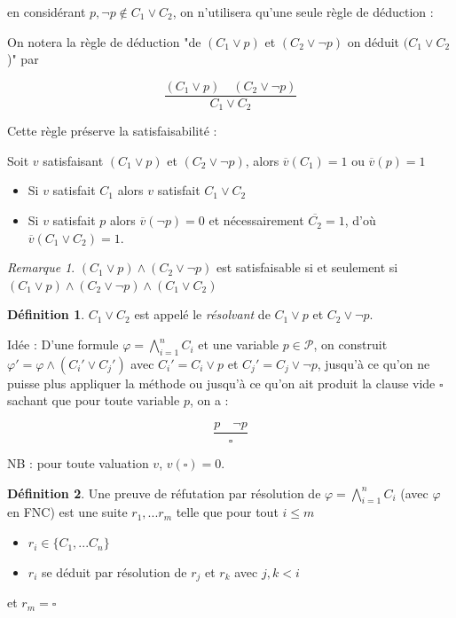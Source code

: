 \documentclass[]{article}
\theoremstyle{remark}
\newtheorem{myrem}{Remarque}
\theoremstyle{definition}
\newtheorem{mydef}{Définition}
\begin{document}
en considérant $p, \neg p \notin C_1 \lor C_2$, on n'utilisera qu'une seule règle de déduction :

On notera la règle de déduction "de $(C_1 \lor p)$ et $(C_2 \lor \neg p)$ on déduit $(C_1 \lor C_2$)" par

$$\frac{(C_1 \lor p) \quad (C_2 \lor \neg p)}{C_1 \lor C_2}$$

Cette règle préserve la satisfaisabilité :

Soit $v$ satisfaisant $(C_1 \lor p)$ et $(C_2 \lor \neg p)$, alors $\overline{v}(C_1) = 1$ ou $\overline{v}(p) = 1$

\begin{itemize}
	\item Si $v$ satisfait $C_1$ alors $v$ satisfait $C_1 \lor C_2$
	\item Si $v$ satisfait $p$ alors $\overline{v}(\neg p) = 0$ et nécessairement $\overline{C_2} = 1$, d'où $\overline{v}(C_1 \lor C_2) = 1$.
\end{itemize}

\begin{myrem}
	$(C_1 \lor p) \land (C_2 \lor \neg p)$ est satisfaisable si et seulement si $(C_1 \lor p) \land (C_2 \lor \neg p) \land (C_1 \lor C_2)$
\end{myrem}

\begin{mydef}
	$C_1 \lor C_2$ est appelé le \textit{résolvant} de $C_1 \lor p$ et $C_2 \lor \neg p$.
\end{mydef}

Idée : D'une formule $\displaystyle \varphi = \bigwedge_{i = 1}^n C_i$ et une variable $p \in \mathcal{P}$, on construit $\varphi' = \varphi \land (C_i' \lor C_j')$ avec $C_i' = C_i \lor p$ et $C_j' = C_j \lor \neg p$, jusqu'à ce qu'on ne puisse plus appliquer la méthode ou jusqu'à ce qu'on ait produit la clause vide $\square$ sachant que pour toute variable $p$, on a :

$$\frac{p \quad \neg p}{\square}$$

NB : pour toute valuation $v$, $v(\square) = 0$.

\begin{mydef}
	Une preuve de réfutation par résolution de $\displaystyle \varphi = \bigwedge_{i=1}^n C_i$ (avec $\varphi$ en FNC) est une suite $r_1, ...r_m$ telle que pour tout $i \leqslant m$
	\begin{itemize}
		\item $r_i \in \{C_1, ... C_n\}$
		\item $r_i$ se déduit par résolution de $r_j$ et $r_k$ avec $j, k < i$
	\end{itemize}
	
	et $r_m = \square$
\end{mydef}
\end{document}
